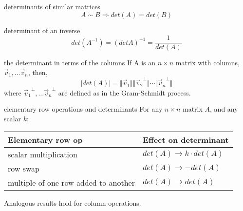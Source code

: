 \documentclass[avery5371,grid,letterpaper]{flashcards}
\begin{document}
\begin{flashcard}[Theorem]{determinants of similar matrices}
\begin{displaymath}
A \sim B \Rightarrow det(A) = det(B)
\end{displaymath}
\end{flashcard}

\begin{flashcard}[Theorem]{determinant of an inverse}
\begin{displaymath}
det(A^{-1}) = (det A)^{-1} = \frac{1}{det(A)}
\end{displaymath}
\end{flashcard}

\begin{flashcard}[Theorem]{the determinant in terms of the columns}
If A is an $n \times n$ matrix with columns, $\vec{v}_1, \ldots \vec{v}_n$, then,
\begin{displaymath}
\vert det(A) \vert =
\Vert \vec{v}_1 \Vert
\Vert {\vec{v}_2}^{\bot} \Vert
\cdots
\Vert {\vec{v}_n}^{\bot} \Vert
\end{displaymath}
where ${\vec{v}_1}^{\bot}, \ldots {\vec{v}_n}^{\bot}$ are defined as in the Gram-Schmidt process.
\end{flashcard}

\begin{flashcard}[Theorem]{elementary row operations and determinants}
For any $n \times n$ matrix $A$, and any scalar $k$:
\smallskip
\begin{small}
\begin{center}
\begin{tabular}{|p{3cm}|l|}
\hline
Elementary row op & Effect on determinant \\
\hline
scalar multiplication & $det(A) \rightarrow k \cdot det(A)$ \\
\hline
row swap & $det(A) \rightarrow -det(A)$ \\
\hline
multiple of one row added to another & $det(A) \rightarrow det(A)$ \\
\hline
\end{tabular}
\end{center}
\end{small}
\smallskip
Analogous results hold for column operations.
\end{flashcard}
\end{document}
